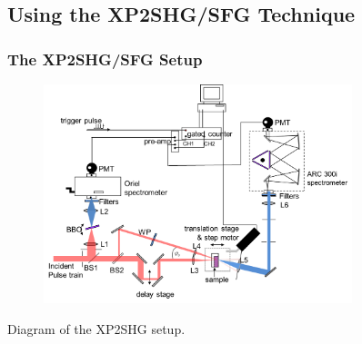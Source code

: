 \documentclass{beamer}
\begin{document}
\subsection{Using the XP2SHG/SFG Technique}
\begin{frame}
\frametitle{The XP2SHG/SFG Setup}
\begin{figure}
\centering
\includegraphics[width=0.8\textwidth]{xp2_diag}
\end{figure}
\begin{center}
Diagram of the XP2SHG setup.
\end{center}
\end{frame}
\end{document}
